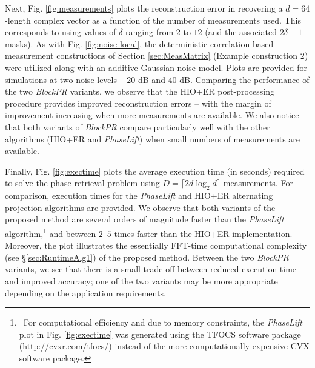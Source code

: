 Next, Fig. \ref{fig:measurements} plots the reconstruction error in recovering a $d=64$-length
complex vector as a function of the number of measurements used. This corresponds to using values of
$\delta$ ranging from $2$ to $12$ (and the associated $2\delta-1$ masks). As with Fig.
\ref{fig:noise-local}, the deterministic correlation-based measurement constructions of Section
\ref{sec:MeasMatrix} (Example construction $2$) were utilized along with an additive Gaussian noise
model. Plots are provided for simulations at two noise levels -- $20$ dB and $40$ dB. 
Comparing the performance of the two {\em BlockPR} variants, we observe that the HIO+ER post-processing 
procedure provides improved reconstruction errors -- with the margin of improvement increasing when 
more measurements are available. We also notice that both variants of {\em BlockPR} compare
particularly well with the other algorithms (HIO+ER and {\em PhaseLift}) when small numbers of measurements are available.

Finally, Fig. \ref{fig:exectime} plots the average execution time (in seconds) required to solve the
phase retrieval problem using $D = \lceil 2d\log_2d\rceil$ measurements. For comparison, execution
times for the {\em PhaseLift} and HIO+ER alternating projection algorithms are provided. We observe
that both variants of the proposed method are several orders of magnitude faster than the {\em
PhaseLift} algorithm,\footnote{\ For computational efficiency and due to memory constraints, the {\em
PhaseLift} plot in Fig. \ref{fig:exectime} was generated using the TFOCS software package
(http://cvxr.com/tfocs/) instead of the more computationally expensive CVX software package.} and between
$2$--$5$ times faster than the HIO+ER implementation. Moreover, the plot illustrates the essentially
FFT-time computational complexity (see \S \ref{sec:RuntimeAlg1}) of the proposed method. Between the
two {\em BlockPR} variants, we see that there is a small trade-off between reduced execution time and
improved accuracy; one of the two variants may be more appropriate depending on the application
requirements.

